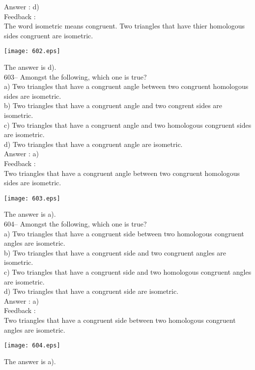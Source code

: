 \documentclass[letterpaper, 12pt]{article}
\begin{document}
Answer : d)\\

Feedback : \\
The word isometric means congruent.  Two triangles that have thier homologous sides congruent are isometric.
\begin{center}
    \texttt{[image: 602.eps]}
    \end{center} The answer is d).\\

603-- Amongst the following, which one is true?\\
a) Two triangles that have a congruent angle between two congruent homologous sides are isometric. \\
b) Two triangles that have a congruent angle and two congrent sides are isometric.\\
c) Two triangles that have a congruent angle and two homologous congruent sides are isometric.\\
d) Two triangles that have a congruent angle are isometric.\\

Answer : a)\\

Feedback : \\
Two triangles that have a congruent angle between two congruent homologous sides are isometric.
   \begin{center}
    \texttt{[image: 603.eps]}
    \end{center}  The answer is a).\\

604-- Amongst the following, which one is true?\\
a) Two triangles that have a congruent side between two homologous congruent angles are isometric.\\
b) Two triangles that have a congruent side and two congruent angles are isometric.\\
c) Two triangles that have a congruent side and two homologous congruent angles are isometric.\\
d) Two triangles that have a congruent side are isometric.\\

Answer : a) \\

Feedback : \\
Two triangles that have a congruent side between two homologous congruent angles are isometric.
   \begin{center}
    \texttt{[image: 604.eps]}
    \end{center}  The answer is a).\\
\end{document}
